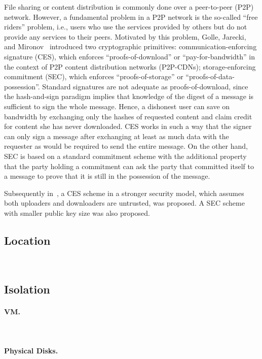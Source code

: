 File sharing or content distribution is commonly done over a peer-to-peer (P2P) network. However, a fundamental problem in a P2P network is the so-called ``free riders'' problem, i.e., users who use the services provided by others but do not provide any services to their peers. 
Motivated by this problem, Golle, Jarecki, and Mironov~\cite{GJM02} introduced two cryptographic primitives:
communication-enforcing signature (CES), which enforces ``proofs-of-download'' or ``pay-for-bandwidth'' in the context of P2P content distribution networks (P2P-CDNs);
storage-enforcing commitment (SEC), which enforces ``proofs-of-storage'' or ``proofs-of-data-possession''.
Standard signatures are not adequate as proofs-of-download, since the hash-and-sign paradigm implies that knowledge of the digest of a message is sufficient to sign the whole message. Hence, a dishonest user can save on bandwidth by exchanging only the hashes of requested content and claim credit for content she has never downloaded. CES works in such a way that the signer can only sign a message after exchanging at least as much data with the requester as would be required to send the entire message. On the other hand, SEC is based on a standard commitment scheme with the additional property that the party holding a commitment can ask the party that committed itself to a message to prove that it is still in the possession of the message.

Subsequently in~\cite{FB06}, a CES scheme in a stronger security model, which assumes both uploaders and downloaders are untrusted, was proposed. A SEC scheme with smaller public key size was also proposed.



\subsection{Location}

~\cite{BDS11,WSA+12}

\subsection{Isolation}

\paragraph{VM.}
~\cite{ZJO+11}

\paragraph{Physical Disks.}

